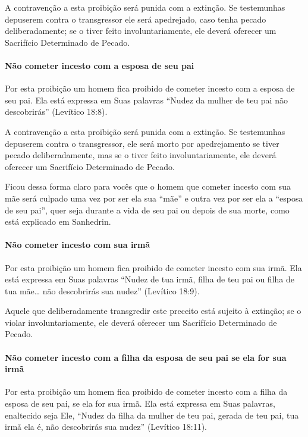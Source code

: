 A contravenção a esta proibição será punida com a extinção. Se
testemunhas depuserem contra o transgressor ele será apedrejado, caso
tenha pecado deliberadamente; se o tiver feito involuntariamente, ele
deverá oferecer um Sacrifício Determinado de Pecado.

\paragraph{Não cometer incesto com a esposa de seu pai}

Por esta proibição um homem fica proibido de cometer incesto com a
esposa de seu pai. Ela está expressa em Suas palavras ``Nudez da mulher
de teu pai não descobrirás'' (Levítico 18:8).

A contravenção a esta proibição será punida com a extinção. Se
testemunhas depuserem contra o transgressor, ele será morto por
apedrejamento se tiver pecado deliberadamente, mas se o tiver feito
involuntariamente, ele deverá oferecer um Sacrifício Determinado de
Pecado.

Ficou dessa forma claro para vocês que o homem que cometer incesto com
sua mãe será culpado uma vez por ser ela sua ``mãe'' e outra vez por ser
ela a ``esposa de seu pai'', quer seja durante a vida de seu pai ou
depois de sua morte, como está explicado em Sanhedrin.

\paragraph{Não cometer incesto com sua irmã}

Por esta proibição um homem fica proibido de cometer incesto com sua
irmã. Ela está expressa em Suas palavras ``Nudez de tua irmã, filha de
teu pai ou filha de tua mãe\ldots{} não descobrirás sua nudez'' (Levítico
18:9).

Aquele que deliberadamente transgredir este preceito está sujeito à
extinção; se o violar involuntariamente, ele deverá oferecer um
Sacrifício Determinado de Pecado.

\paragraph{Não cometer incesto com a filha da esposa de seu pai se ela for sua irmã}

Por esta proibição um homem fica proibido de cometer incesto com a filha
da esposa de seu pai, se ela for sua irmã. Ela está expressa em Suas
palavras, enaltecido seja Ele, ``Nudez da filha da mulher de teu pai,
gerada de teu pai, tua irmã ela é, não descobrirás sua nudez'' (Levítico
18:11).

